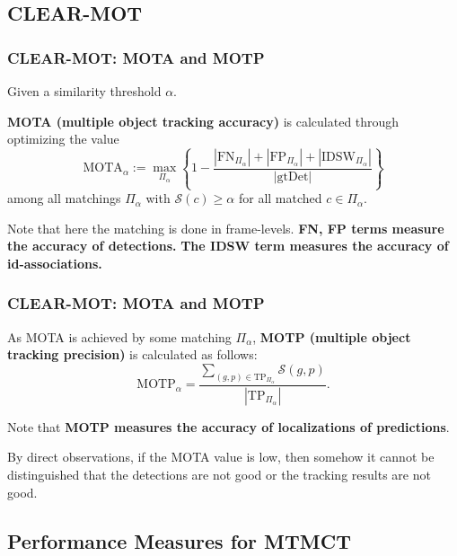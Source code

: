 \documentclass[slidetop, mathserif]{beamer}
\begin{document}
\subsection{CLEAR-MOT}

\begin{frame}
	\frametitle{CLEAR-MOT: MOTA and MOTP}
	
	
	Given a similarity threshold $\alpha$.
	
	\quad
	
	{\bf MOTA (multiple object tracking accuracy)} is calculated through optimizing the value
	\[
		\text{MOTA}_\alpha :=
		\max_{\Pi_\alpha}
		\left\{1 - \dfrac{|\text{FN}_{\Pi_\alpha}| + |\text{FP}_{\Pi_\alpha}| + |\text{IDSW}_{\Pi_\alpha}|}{|\text{gtDet}|}\right\}
	\]
	among all matchings $\Pi_\alpha$ with $\mathcal S(c)\geq \alpha$ for all matched $c\in\Pi_\alpha$.
	
	\quad
	
	Note that here the matching is done in frame-levels.
	{\bf\color{blue} FN, FP terms measure the accuracy of detections.}
	{\bf\color{olive} The IDSW term measures the accuracy of id-associations.}
	
\end{frame}

\begin{frame}
	\frametitle{CLEAR-MOT: MOTA and MOTP}
	
	As MOTA is achieved by some matching $\Pi_\alpha$, {\bf MOTP (multiple object tracking precision)}
	is calculated as follows:
	\[
		\text{MOTP}_\alpha =
		\dfrac{\sum_{(g,p)\in\text{TP}_{\Pi_\alpha}}\mathcal S(g,p)}{|\text{TP}_{\Pi_\alpha}|}.
	\]
	
	\quad 
	
	Note that {\bf\color{red} MOTP measures the accuracy of localizations of predictions}.
	
	By direct observations, if the MOTA value is low,
	then somehow it cannot be distinguished that
	the detections are not good or the tracking results are not good.
	
	
\end{frame}

\subsection{Performance Measures for MTMCT}
\end{document}
